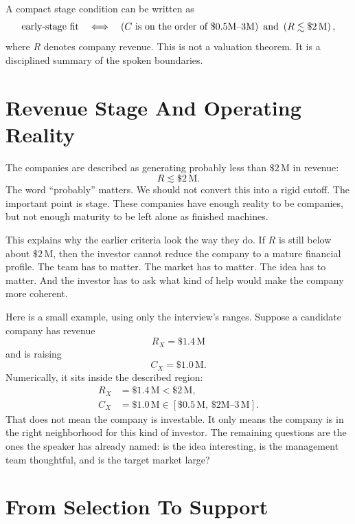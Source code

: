 A compact stage condition can be written as
\begin{equation}
\hbox{early-stage fit}
\quad \Longleftrightarrow \quad
\left(
C \hbox{ is on the order of } \$0.5\text{M--}3\text{M}
\right)
\hbox{ and }
\left(
R \lesssim \$2\,\text{M}
\right),
\end{equation}
where \(R\) denotes company revenue. This is not a valuation theorem. It is a disciplined summary of the spoken boundaries.

\section{Revenue Stage And Operating Reality}

The companies are described as generating probably less than \( \$2\,\text{M} \) in revenue:
\begin{equation}
R \lesssim \$2\,\text{M}.
\end{equation}
The word ``probably'' matters. We should not convert this into a rigid cutoff. The important point is stage. These companies have enough reality to be companies, but not enough maturity to be left alone as finished machines.

This explains why the earlier criteria look the way they do. If \(R\) is still below about \( \$2\,\text{M} \), then the investor cannot reduce the company to a mature financial profile. The team has to matter. The market has to matter. The idea has to matter. And the investor has to ask what kind of help would make the company more coherent.

Here is a small example, using only the interview's ranges. Suppose a candidate company has revenue
\[
R_X = \$1.4\,\text{M}
\]
and is raising
\[
C_X = \$1.0\,\text{M}.
\]
Numerically, it sits inside the described region:
\begin{align}
R_X &= \$1.4\,\text{M} < \$2\,\text{M},\\
C_X &= \$1.0\,\text{M} \in [\$0.5\,\text{M},\, \$2\text{M--}3\,\text{M}].
\end{align}
That does not mean the company is investable. It only means the company is in the right neighborhood for this kind of investor. The remaining questions are the ones the speaker has already named: is the idea interesting, is the management team thoughtful, and is the target market large?

\section{From Selection To Support}

